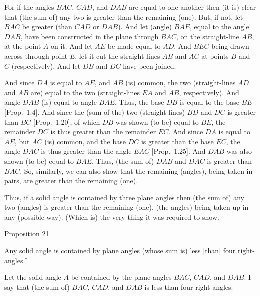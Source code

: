 For if the angles $BAC$, $CAD$, and $DAB$ are equal to one another
then (it is) clear that (the sum of) any two is greater than
the remaining (one). But, if not, let $BAC$ be greater (than $CAD$ or $DAB$). And let (angle) $BAE$, equal to the angle $DAB$,  have been constructed in the plane through $BAC$, on the straight-line $AB$,
at the point $A$ on it. And let $AE$ be made equal to $AD$. And $BEC$
being drawn across through point $E$, let it cut the straight-lines $AB$
and $AC$ at points $B$ and $C$ (respectively). And let
$DB$ and $DC$ have been joined.

And since $DA$ is equal to $AE$, and $AB$ (is) common, the
two (straight-lines $AD$ and $AB$ are) equal to the two (straight-lines
$EA$ and $AB$, respectively). And angle $DAB$ (is) equal
to angle $BAE$. Thus, the base $DB$ is equal to the base $BE$ [Prop.~1.4]. And since the
(sum of the) two (straight-lines) $BD$ and $DC$ is greater than $BC$
[Prop.~1.20], of which $DB$ was shown
(to be) equal to $BE$, the  remainder $DC$ is thus greater than the
remainder $EC$. And since $DA$ is equal to $AE$, but
$AC$ (is) common, and the base $DC$ is  greater than the base
$EC$, the angle $DAC$ is thus greater than the angle $EAC$
[Prop.~1.25]. And $DAB$
was also shown (to be) equal to $BAE$. Thus, 
(the sum of) $DAB$ and $DAC$ is greater than $BAC$. So,
similarly, we can also show that the remaining  (angles), being taken in pairs, are greater than the remaining (one).

Thus,  if a solid angle is contained by three plane angles
then (the sum of) any two (angles) is greater than the remaining (one), (the angles) being taken up in any (possible way). (Which is) the very thing it
was required to show.


\begin{center}
{\large Proposition 21}
\end{center}

Any solid angle is contained by plane angles (whose sum is) less [than]
four  right-angles.$^\dag$

\epsfysize=1.5in
\centerline{}

Let the solid angle $A$ be contained by the plane angles $BAC$,
$CAD$, and $DAB$. I say that (the sum of) $BAC$, $CAD$, and $DAB$
is less than four right-angles.

